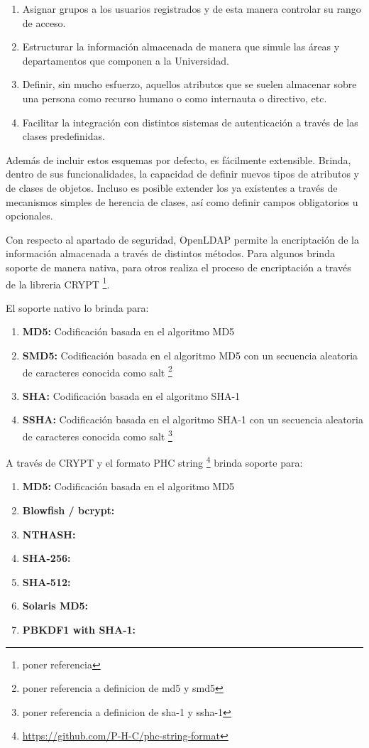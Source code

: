 \begin{enumerate}
	\item Asignar grupos a los usuarios registrados y de esta manera controlar su rango de acceso.
	\item Estructurar la información almacenada de manera que simule las áreas y departamentos
	que componen a la Universidad.
	\item Definir, sin mucho esfuerzo, aquellos atributos que se suelen almacenar sobre una persona
	como recurso humano o como internauta o directivo, etc.
	\item Facilitar la integración con distintos sistemas de autenticación a través de las clases
	predefinidas.
\end{enumerate}

Además de incluir estos esquemas por defecto, es fácilmente extensible. Brinda, dentro de sus
funcionalidades, la capacidad de definir nuevos tipos de atributos y de clases de objetos. Incluso
es posible extender los ya existentes a través de mecanismos simples de herencia de clases, así como
definir campos obligatorios u opcionales.

Con respecto al apartado de seguridad, OpenLDAP permite la encriptación de la información
almacenada a través de distintos métodos. Para algunos brinda soporte de manera nativa, para 
otros realiza el proceso de encriptación a través de la libreria CRYPT \footnote{poner referencia}.

\newpage

El soporte nativo lo brinda para:

\begin{enumerate}
	\item {\bf MD5:} Codificación basada en el algoritmo MD5
	\item {\bf SMD5:} Codificación basada en el algoritmo MD5 con un secuencia aleatoria de 
		caracteres conocida como salt \footnote{ poner referencia a definicion de md5 y smd5}
	\item {\bf SHA:} Codificación basada en el algoritmo SHA-1
	\item {\bf SSHA:} Codificación basada en el algoritmo SHA-1 con un secuencia aleatoria de 
		caracteres conocida como salt \footnote{ poner referencia a definicion de sha-1 y ssha-1}
\end{enumerate}

A través de CRYPT y el formato PHC string \footnote{ \url{https://github.com/P-H-C/phc-string-format}}
brinda soporte para:

\begin{enumerate}
	\item {\bf MD5:} Codificación basada en el algoritmo MD5
	\item {\bf 	Blowfish / bcrypt:} 
	\item {\bf NTHASH:} 
	\item {\bf SHA-256:} 
	\item {\bf SHA-512:} 
	\item {\bf Solaris MD5:} 
	\item {\bf PBKDF1 with SHA-1:} 
\end{enumerate}

